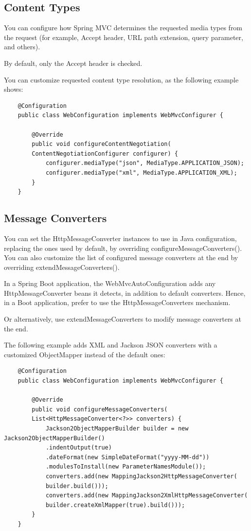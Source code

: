 \documentclass{scrartcl}
\begin{document}
\subsection{Content Types}

You can configure how Spring MVC determines the requested media types from the request (for example, Accept header, URL path extension, query parameter, and others).

By default, only the Accept header is checked.

You can customize requested content type resolution, as the following example shows:

\begin{lstlisting}
    @Configuration
    public class WebConfiguration implements WebMvcConfigurer {

        @Override
        public void configureContentNegotiation(
        ContentNegotiationConfigurer configurer) {
            configurer.mediaType("json", MediaType.APPLICATION_JSON);
            configurer.mediaType("xml", MediaType.APPLICATION_XML);
        }
    }
\end{lstlisting}

\subsection{Message Converters}

You can set the HttpMessageConverter instances to use in Java configuration, replacing the ones used by default, by overriding configureMessageConverters(). You can also customize the list of configured message converters at the end by overriding extendMessageConverters().

In a Spring Boot application, the WebMvcAutoConfiguration adds any HttpMessageConverter beans it detects, in addition to default converters. Hence, in a Boot application, prefer to use the HttpMessageConverters mechanism.

Or alternatively, use extendMessageConverters to modify message converters at the end.

The following example adds XML and Jackson JSON converters with a customized ObjectMapper instead of the default ones:

\begin{lstlisting}
    @Configuration
    public class WebConfiguration implements WebMvcConfigurer {

        @Override
        public void configureMessageConverters(
        List<HttpMessageConverter<?>> converters) {
            Jackson2ObjectMapperBuilder builder = new Jackson2ObjectMapperBuilder()
            .indentOutput(true)
            .dateFormat(new SimpleDateFormat("yyyy-MM-dd"))
            .modulesToInstall(new ParameterNamesModule());
            converters.add(new MappingJackson2HttpMessageConverter(
            builder.build()));
            converters.add(new MappingJackson2XmlHttpMessageConverter(
            builder.createXmlMapper(true).build()));
        }
    }
\end{lstlisting}
\end{document}
